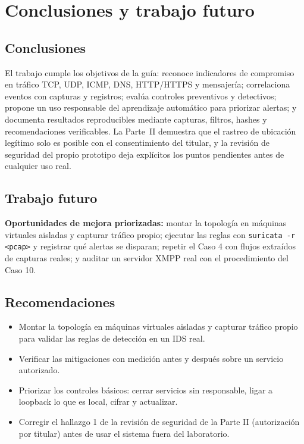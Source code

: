 \chapter{Conclusiones y trabajo futuro}
\label{ch:conclusiones}
\section{Conclusiones}
El trabajo cumple los objetivos de la gu\'ia: reconoce indicadores de compromiso en tr\'afico TCP, UDP, ICMP, DNS, HTTP/HTTPS y mensajer\'ia; correlaciona eventos con capturas y registros; eval\'ua controles preventivos y detectivos; propone un uso responsable del aprendizaje autom\'atico para priorizar alertas; y documenta resultados reproducibles mediante capturas, filtros, hashes y recomendaciones verificables. La Parte~II demuestra que el rastreo de ubicaci\'on leg\'itimo solo es posible con el consentimiento del titular, y la revisi\'on de seguridad del propio prototipo deja expl\'icitos los puntos pendientes antes de cualquier uso real.

\section{Trabajo futuro}
\textbf{Oportunidades de mejora priorizadas:} montar la topología en máquinas virtuales aisladas y capturar tráfico propio; ejecutar las reglas con \texttt{suricata -r <pcap>} y registrar qué alertas se disparan; repetir el Caso 4 con flujos extraídos de capturas reales; y auditar un servidor XMPP real con el procedimiento del Caso 10.

\section{Recomendaciones}
\begin{itemize}
  \item Montar la topología en máquinas virtuales aisladas y capturar tráfico propio para validar las reglas de detección en un IDS real.
  \item Verificar las mitigaciones con medición antes y después sobre un servicio autorizado.
  \item Priorizar los controles básicos: cerrar servicios sin responsable, ligar a loopback lo que es local, cifrar y actualizar.
  \item Corregir el hallazgo 1 de la revisión de seguridad de la Parte II (autorización por titular) antes de usar el sistema fuera del laboratorio.
\end{itemize}
